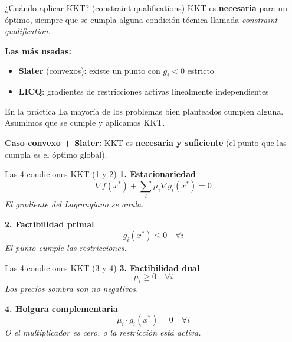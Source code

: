\documentclass{beamer}
\begin{document}
\begin{frame}{¿Cuándo aplicar KKT? (constraint qualifications)}
    \small
    KKT es \textbf{necesaria} para un óptimo, siempre que se cumpla alguna condición técnica llamada \textit{constraint qualification}.

    \vspace{0.3em}

    \textbf{Las más usadas:}
    \begin{itemize}
        \item \textbf{Slater} (convexos): existe un punto con $g_i < 0$ estricto
        \item \textbf{LICQ}: gradientes de restricciones activas linealmente independientes
    \end{itemize}

    \vspace{0.3em}

    \begin{alertblock}{En la práctica}
        La mayoría de los problemas bien planteados cumplen alguna. Asumimos que se cumple y aplicamos KKT.
    \end{alertblock}

    \textbf{Caso convexo + Slater:} KKT es \textbf{necesaria y suficiente} (el punto que las cumpla es el óptimo global).
\end{frame}

\begin{frame}{Las 4 condiciones KKT (1 y 2)}
    \small
    \textbf{1. Estacionariedad}
    \[
    \nabla f(x^*) + \sum_i \mu_i \nabla g_i(x^*) = 0
    \]
    \textit{El gradiente del Lagrangiano se anula.}

    \vspace{1em}

    \textbf{2. Factibilidad primal}
    \[
    g_i(x^*) \leq 0 \quad \forall i
    \]
    \textit{El punto cumple las restricciones.}
\end{frame}

\begin{frame}{Las 4 condiciones KKT (3 y 4)}
    \small
    \textbf{3. Factibilidad dual}
    \[
    \mu_i \geq 0 \quad \forall i
    \]
    \textit{Los precios sombra son no negativos.}

    \vspace{1em}

    \textbf{4. Holgura complementaria}
    \[
    \mu_i \cdot g_i(x^*) = 0 \quad \forall i
    \]
    \textit{O el multiplicador es cero, o la restricción está activa.}
\end{frame}
\end{document}
